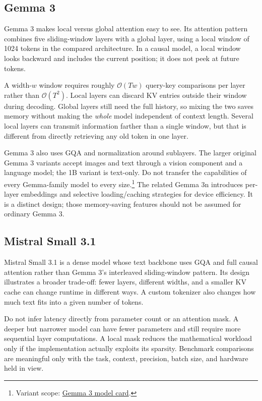 \documentclass[11pt, oneside]{book}
\newcommand{\bigO}[1]{\mathcal{O}\!\left(#1\right)}
\let\originalsubsection\subsection
\renewcommand{\subsection}{\Needspace{6\baselineskip}\originalsubsection}
\begin{document}
\subsection{Gemma 3}\label{sec:source-5-4-4}
Gemma 3 makes local versus global attention easy to see. Its attention pattern combines five sliding-window layers with a global layer, using a local window of 1024 tokens in the compared architecture. In a causal model, a local window looks backward and includes the current position; it does not peek at future tokens.

A width-$w$ window requires roughly $\bigO{Tw}$ query-key comparisons per layer rather than $\bigO{T^2}$. Local layers can discard KV entries outside their window during decoding. Global layers still need the full history, so mixing the two saves memory without making the \emph{whole} model independent of context length. Several local layers can transmit information farther than a single window, but that is different from directly retrieving any old token in one layer.

Gemma 3 also uses GQA and normalization around sublayers. The larger original Gemma 3 variants accept images and text through a vision component and a language model; the 1B variant is text-only. Do not transfer the capabilities of every Gemma-family model to every size.\footnote{Variant scope: \href{https://huggingface.co/google/gemma-3-4b-it}{Gemma 3 model card}.} The related Gemma 3n introduces per-layer embeddings and selective loading/caching strategies for device efficiency. It is a distinct design; those memory-saving features should not be assumed for ordinary Gemma 3.

\subsection{Mistral Small 3.1}\label{sec:source-5-4-5}
Mistral Small 3.1 is a dense model whose text backbone uses GQA and full causal attention rather than Gemma 3's interleaved sliding-window pattern. Its design illustrates a broader trade-off: fewer layers, different widths, and a smaller KV cache can change runtime in different ways. A custom tokenizer also changes how much text fits into a given number of tokens.

Do not infer latency directly from parameter count or an attention mask. A deeper but narrower model can have fewer parameters and still require more sequential layer computations. A local mask reduces the mathematical workload only if the implementation actually exploits its sparsity. Benchmark comparisons are meaningful only with the task, context, precision, batch size, and hardware held in view.
\end{document}
